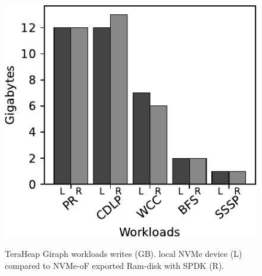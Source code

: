 \begin{figure}[H]
  \includegraphics[width=\linewidth]{figures/ram_gir_w.pdf}\\
\caption{TeraHeap Giraph workloads writes (GB). local NVMe device (L) compared to NVMe-oF exported Ram-disk with SPDK (R).}
\label{fig:ram_gir_w}
\end{figure}
